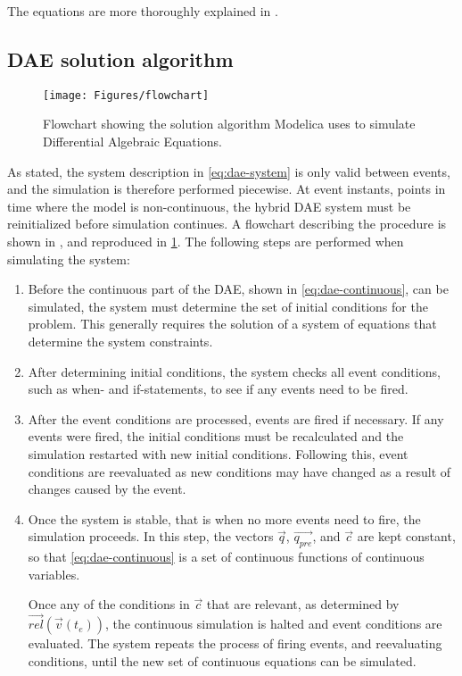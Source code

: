 \documentclass[\rootfolder/main.tex]{subfiles}
\begin{document}
The equations are more thoroughly explained in \cite{openmodelica.org:lundvall:sims:2005}.

\subsection{DAE solution algorithm}

\begin{figure}[H]
    \centering
    \texttt{[image: Figures/flowchart]}
    \caption{Flowchart showing the solution algorithm Modelica uses to simulate Differential Algebraic Equations.\label{fig:modelica-dae-flowchart}}
\end{figure}

As stated, the system description in \cref{eq:dae-system} is only valid between events, and the simulation is therefore performed piecewise.
At event instants, points in time where the model is non-continuous, the hybrid DAE system must be reinitialized before simulation continues.
A flowchart describing the procedure is shown in \cite{openmodelica.org:lundvall:sims:2005}, and reproduced in \cref{fig:modelica-dae-flowchart}.
The following steps are performed when simulating the system:

\begin{enumerate}
    \item Before the continuous part of the DAE, shown in \cref{eq:dae-continuous}, can be simulated, the system must determine the set of initial conditions for the problem.
	This generally requires the solution of a system of equations that determine the system constraints.

    \item After determining initial conditions, the system checks all event conditions, such as when- and if-statements, to see if any events need to be fired.

    \item After the event conditions are processed, events are fired if necessary.
	If any events were fired, the initial conditions must be recalculated and the simulation restarted with new initial conditions.
	Following this, event conditions are reevaluated as new conditions may have changed as a result of changes caused by the event.

    \item Once the system is stable, that is when no more events need to fire, the simulation proceeds.
	In this step, the vectors $\vec{q}$, $\vec{q_{pre}}$, and $\vec{c}$ are kept constant, so that \cref{eq:dae-continuous} is a set of continuous functions of continuous variables.

	Once any of the conditions in $\vec{c}$ that are relevant, as determined by $\vec{rel}(\vec{v}(t_{e}))$, the continuous simulation is halted and event conditions are evaluated.
	The system repeats the process of firing events, and reevaluating conditions, until the new set of continuous equations can be simulated.
\end{enumerate}
\end{document}
